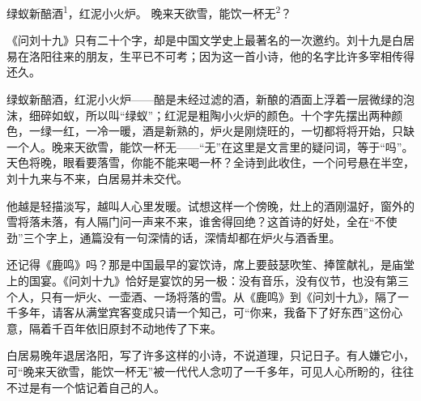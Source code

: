 
\begin{poem}
绿蚁新醅酒\textsuperscript{1}，红泥小火炉。
晚来天欲雪，能饮一杯无\textsuperscript{2}？
\end{poem}

\begin{annotations}
\end{annotations}

\begin{appreciation}
《问刘十九》只有二十个字，却是中国文学史上最著名的一次邀约。刘十九是白居易在洛阳往来的朋友，生平已不可考；因为这一首小诗，他的名字比许多宰相传得还久。

绿蚁新醅酒，红泥小火炉——醅是未经过滤的酒，新酿的酒面上浮着一层微绿的泡沫，细碎如蚁，所以叫“绿蚁”；红泥是粗陶小火炉的颜色。十个字先摆出两种颜色，一绿一红，一冷一暖，酒是新熟的，炉火是刚烧旺的，一切都将将开始，只缺一个人。晚来天欲雪，能饮一杯无——“无”在这里是文言里的疑问词，等于“吗”。天色将晚，眼看要落雪，你能不能来喝一杯？全诗到此收住，一个问号悬在半空，刘十九来与不来，白居易并未交代。

他越是轻描淡写，越叫人心里发暖。试想这样一个傍晚，灶上的酒刚温好，窗外的雪将落未落，有人隔门问一声来不来，谁舍得回绝？这首诗的好处，全在“不使劲”三个字上，通篇没有一句深情的话，深情却都在炉火与酒香里。

还记得《鹿鸣》吗？那是中国最早的宴饮诗，席上要鼓瑟吹笙、捧筐献礼，是庙堂上的国宴。《问刘十九》恰好是宴饮的另一极：没有音乐，没有仪节，也没有第三个人，只有一炉火、一壶酒、一场将落的雪。从《鹿鸣》到《问刘十九》，隔了一千多年，请客从满堂宾客变成只请一个知己，可“你来，我备下了好东西”这份心意，隔着千百年依旧原封不动地传了下来。

白居易晚年退居洛阳，写了许多这样的小诗，不说道理，只记日子。有人嫌它小，可“晚来天欲雪，能饮一杯无”被一代代人念叨了一千多年，可见人心所盼的，往往不过是有一个惦记着自己的人。
\end{appreciation}
